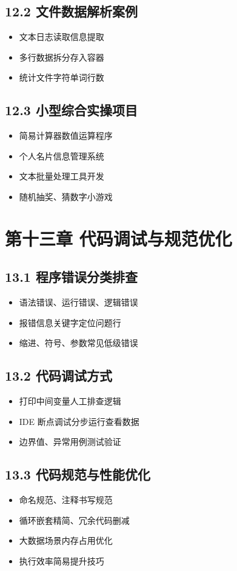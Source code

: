 \subsection{12.2 文件数据解析案例}
\begin{itemize}
\item 文本日志读取信息提取
\item 多行数据拆分存入容器
\item 统计文件字符单词行数
\end{itemize}

\subsection{12.3 小型综合实操项目}
\begin{itemize}
\item 简易计算器数值运算程序
\item 个人名片信息管理系统
\item 文本批量处理工具开发
\item 随机抽奖、猜数字小游戏
\end{itemize}

\section{第十三章 代码调试与规范优化}
\subsection{13.1 程序错误分类排查}
\begin{itemize}
\item 语法错误、运行错误、逻辑错误
\item 报错信息关键字定位问题行
\item 缩进、符号、参数常见低级错误
\end{itemize}

\subsection{13.2 代码调试方式}
\begin{itemize}
\item 打印中间变量人工排查逻辑
\item IDE 断点调试分步运行查看数据
\item 边界值、异常用例测试验证
\end{itemize}

\subsection{13.3 代码规范与性能优化}
\begin{itemize}
\item 命名规范、注释书写规范
\item 循环嵌套精简、冗余代码删减
\item 大数据场景内存占用优化
\item 执行效率简易提升技巧
\end{itemize}
